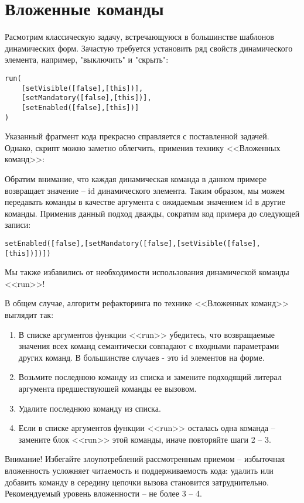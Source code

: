 \documentclass[../index.tex]{subfiles}
\begin{document}
	
\section{Вложенные команды}

Расмотрим классическую задачу, встречающуюся в большинстве шаблонов динамических форм. Зачастую требуется установить ряд свойств динамического элемента, например, "выключить" и "скрыть":
\begin{verbatim}
run(
    [setVisible([false],[this])],
    [setMandatory([false],[this])],
    [setEnabled([false],[this])]
)
\end{verbatim}

Указанный фрагмент кода прекрасно справляется с поставленной задачей. Однако, скрипт можно заметно облегчить, применив технику <<Вложенных команд>>:

Обратим внимание, что каждая динамическая команда в данном примере возвращает значение -- id динамического элемента. Таким образом, мы можем передавать команды в качестве аргумента с ожидаемым значением id в другие команды. Применив данный подход
дважды, сократим код примера до следующей записи:

\begin{verbatim}
setEnabled([false],[setMandatory([false],[setVisible([false],[this])])])
\end{verbatim}

Мы также избавились от необходимости использования динамической команды <<run>>!

В общем случае, алгоритм рефакторинга по технике <<Вложенных команд>> выглядит так:

\begin{enumerate}
	\item В списке аргументов функции <<run>> убедитесь, что возвращаемые значения всех команд семантически совпадают с входными параметрами других команд. В большинстве случаев - это id элементов на форме.
	\item Возьмите последнюю команду из списка и замените подходящий литерал аргумента предшествуюшей команды ее вызовом.
	\item Удалите последнюю команду из списка.
	\item Если в списке аргументов функции <<run>> осталась одна команда -- замените блок <<run>> этой команды, иначе повторяйте шаги 2 -- 3.
\end{enumerate}

Внимание! 
Избегайте злоупотреблений рассмотренным приемом -- избыточная вложенность усложняет читаемость и поддерживаемость кода: удалить или добавить команду в середину цепочки вызова становится затруднительно. Рекомендуемый уровень вложенности -- не более 3 -- 4.
	
\end{document}
